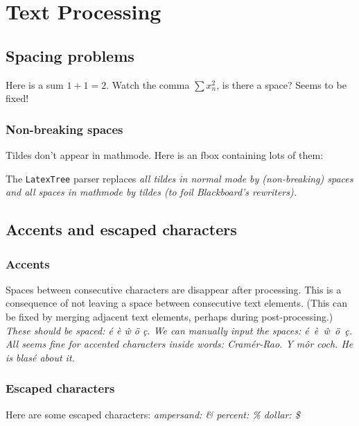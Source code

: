 
\chapter{Text Processing}

\section{Spacing problems}
Here is a sum $1+1=2$. Watch the comma $\sum x_n^2$, is there a space? Seems to be fixed!

\subsection*{Non-breaking spaces}
Tildes don't appear in mathmode. Here is an fbox containing lots of them:
\par
{}
\par

\bigskip
The {\tt LatexTree} parser replaces
\bit
\it all tildes in normal mode by (non-breaking) spaces and
\it all spaces in mathmode by tildes (to foil Blackboard's rewriters).
\eit


\section{Accents and escaped characters}

\subsection*{Accents}
Spaces between consecutive characters are disappear after processing. This is a consequence of not leaving a space between consecutive text elements. (This can be fixed by merging adjacent text elements, perhaps during post-processing.)
\bit
\it These should be spaced: \'{e} \`{e} \^{w} \"{o} \c{c}.
\it We can manually input the spaces: \'{e}\ \`{e}\ \^{w}\ \"{o}\ \c{c}.
\eit
All seems fine for accented characters inside words:
\bit
\it Cram\'{e}r-Rao.
\it Y m\^{o}r coch.
\it He is blas\'{e} about it.
\eit

\subsection*{Escaped characters}
Here are some escaped characters:
\bit
\it ampersand: \& 
\it percent: \%
\it dollar: \$
\eit

